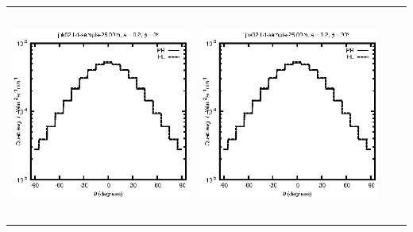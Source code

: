 \documentclass[10pt,a4paper]{article}
\begin{document}
\begin{adjustwidth}{-1.2in}{-1.2in}
\begin{tabular}{c c c c}
\includegraphics[height=7cm]{../eps/jok02_Ld_sample_25.00m_fwd.eps} &
\includegraphics[height=7cm]{../eps/jok02_Ld_sample_25.00m_cross.eps} \\
\end{tabular}

\pagebreak


\end{adjustwidth}
\end{document}
